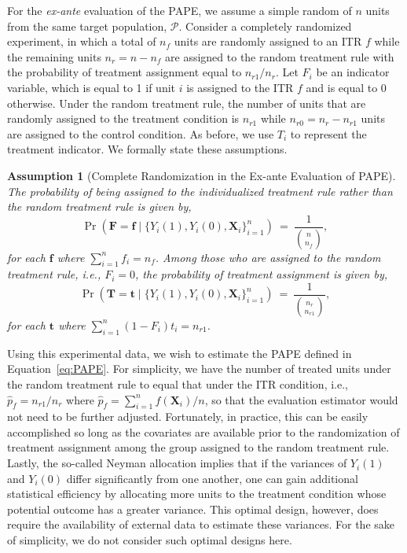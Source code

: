 \documentclass[USenglish,onecolumn]{article}
\newcommand\bX{\bm{X}}
\newcommand\bT{\bm{T}}
\newcommand\bt{\bm{t}}
\newcommand\bF{\bm{F}}
\newtheorem{assumption}{Assumption}
\begin{document}
For the {\it ex-ante} evaluation of the PAPE, we assume a simple
random of $n$ units from the same target population, $\mathcal{P}$.
Consider a completely randomized experiment, in which a total of $n_f$
units are randomly assigned to an ITR $f$ while the remaining units
$n_r = n-n_f$ are assigned to the random treatment rule with the
probability of treatment assignment equal to $n_{r1}/n_r$.  Let $F_i$
be an indicator variable, which is equal to 1 if unit $i$ is assigned
to the ITR $f$ and is equal to 0 otherwise.  Under the random
treatment rule, the number of units that are randomly assigned to the
treatment condition is $n_{r1}$ while $n_{r0} = n_r - n_{r1}$ units
are assigned to the control condition.  As before, we use $T_i$ to
represent the treatment indicator.  We formally state these
assumptions.
\begin{assumption}[Complete Randomization in the Ex-ante Evaluation of PAPE] \label{asm:exante_random}
The probability of being
	assigned to the individualized treatment rule rather than the random
	treatment rule is given by,
	$$\Pr(\bF = \bm{f}\mid \{Y_i(1), Y_i(0), \bX_i\}_{i=1}^n ) \ = \ \frac{1}{ { n \choose n_f}},$$
	for each $\bm{f}$ where $\sum_{i=1}^n f_i = n_f$.  Among those
        who are assigned to the random treatment rule, i.e.,
        $F_i = 0$, the probability of treatment assignment is given
        by,
	$$\Pr(\bT = \bt \mid \{Y_i(1), Y_i(0), \bX_i\}_{i=1}^n) \ = \
	\frac{1}{ { n_r\choose n_{r1}}},$$
	for each $\bt$ where $\sum_{i=1}^n (1-F_i)t_i = n_{r1}$.
\end{assumption}

Using this experimental data, we wish to estimate the PAPE defined in
Equation~\eqref{eq:PAPE}.  For simplicity, we have the number of
treated units under the random treatment rule to equal that under the
ITR condition, i.e., $\hat{p}_f = n_{r1} / n_r$ where
$\hat{p}_f=\sum_{i=1}^n f(\bX_i)/n$, so that the evaluation estimator
would not need to be further adjusted. Fortunately, in practice, this
can be easily accomplished so long as the covariates are available
prior to the randomization of treatment assignment among the group
assigned to the random treatment rule.  Lastly, the so-called Neyman
allocation implies that if the variances of $Y_i(1)$ and $Y_i(0)$
differ significantly from one another, one can gain additional
statistical efficiency by allocating more units to the treatment
condition whose potential outcome has a greater variance.  This
optimal design, however, does require the availability of external
data to estimate these variances.  For the sake of simplicity, we do
not consider such optimal designs here.
\end{document}
